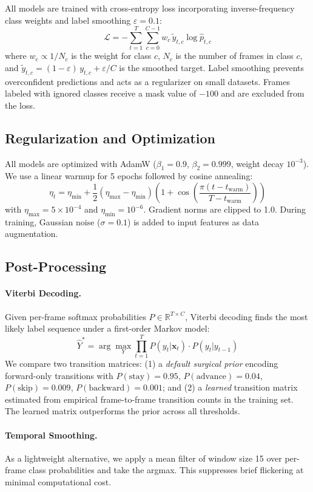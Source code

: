 \documentclass[10pt,twocolumn]{article}
\begin{document}
All models are trained with cross-entropy loss incorporating inverse-frequency class weights and label smoothing $\varepsilon = 0.1$:
\[
\mathcal{L} = -\sum_{t=1}^{T} \sum_{c=0}^{C-1} w_c \, \tilde{y}_{t,c} \log \hat{p}_{t,c}
\]
where $w_c \propto 1/N_c$ is the weight for class $c$, $N_c$ is the number of frames in class $c$, and $\tilde{y}_{t,c} = (1 - \varepsilon)\, y_{t,c} + \varepsilon / C$ is the smoothed target. Label smoothing prevents overconfident predictions and acts as a regularizer on small datasets. Frames labeled with ignored classes receive a mask value of $-100$ and are excluded from the loss.

\subsection{Regularization and Optimization}

All models are optimized with AdamW ($\beta_1 = 0.9$, $\beta_2 = 0.999$, weight decay $10^{-3}$). We use a linear warmup for 5 epochs followed by cosine annealing:
\[
\eta_t = \eta_\text{min} + \frac{1}{2}(\eta_\text{max} - \eta_\text{min})\left(1 + \cos\!\left(\frac{\pi(t - t_\text{warm})}{T - t_\text{warm}}\right)\right)
\]
with $\eta_\text{max} = 5 \times 10^{-4}$ and $\eta_\text{min} = 10^{-6}$. Gradient norms are clipped to 1.0. During training, Gaussian noise ($\sigma = 0.1$) is added to input features as data augmentation.

\subsection{Post-Processing}

\paragraph{Viterbi Decoding.} Given per-frame softmax probabilities $P \in \mathbb{R}^{T \times C}$, Viterbi decoding finds the most likely label sequence under a first-order Markov model:
\[
\hat{Y}^* = \arg\max_{Y} \prod_{t=1}^{T} P(y_t | \mathbf{x}_t) \cdot P(y_t | y_{t-1})
\]
We compare two transition matrices: (1) a \emph{default surgical prior} encoding forward-only transitions with $P(\text{stay}) = 0.95$, $P(\text{advance}) = 0.04$, $P(\text{skip}) = 0.009$, $P(\text{backward}) = 0.001$; and (2) a \emph{learned} transition matrix estimated from empirical frame-to-frame transition counts in the training set. The learned matrix outperforms the prior across all thresholds.

\paragraph{Temporal Smoothing.} As a lightweight alternative, we apply a mean filter of window size 15 over per-frame class probabilities and take the argmax. This suppresses brief flickering at minimal computational cost.
\end{document}
